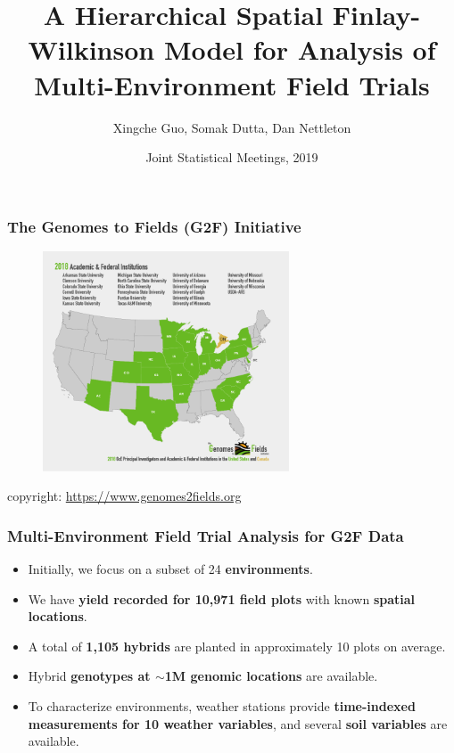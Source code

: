 \documentclass{beamer}
\title[Hierarchical Spatial FW Model for MET]{A Hierarchical Spatial Finlay-Wilkinson Model for Analysis of Multi-Environment Field Trials}
\author[Guo, X., Dutta, S., Nettleton, D.]{Xingche Guo, Somak Dutta, Dan Nettleton}
\institute[ISU]{Dept. of Statistics, Iowa State University}
\date[JSM, 2019]{Joint Statistical Meetings, 2019}
\begin{document}
\renewcommand{\inserttotalframenumber}{18}
\begin{frame}
\titlepage
\end{frame}




\begin{frame}
	\frametitle{The Genomes to Fields (G2F) Initiative}
	\begin{figure}[H]
		\centering
		\includegraphics[width = 0.65\textwidth]{g2f_demo.png}
	\end{figure}	
	copyright:	\url{https://www.genomes2fields.org}
\end{frame}


\begin{frame}
	\frametitle{Multi-Environment Field Trial Analysis for G2F Data}
	\begin{itemize}
	\item Initially, we focus on a subset of 24 \textbf{environments}.
	\item We have \textbf{yield recorded for 10,971 field plots} with known \textbf{spatial locations}.
	\item A total of \textbf{1,105 hybrids} are planted in approximately 10 plots on average.
	\item Hybrid \textbf{genotypes at $\sim$1M genomic locations} are available.
	\item To characterize environments, weather stations provide \textbf{time-indexed measurements for 10 weather variables}, and several \textbf{soil variables} are available.
	\end{itemize}	
\end{frame}
\end{document}
